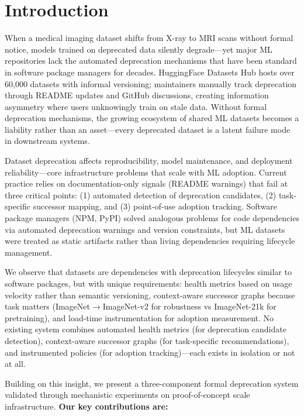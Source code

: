 \section{Introduction}

When a medical imaging dataset shifts from X-ray to MRI scans without formal notice, models trained on deprecated data silently degrade---yet major ML repositories lack the automated deprecation mechanisms that have been standard in software package managers for decades. HuggingFace Datasets Hub hosts over 60,000 datasets with informal versioning; maintainers manually track deprecation through README updates and GitHub discussions, creating information asymmetry where users unknowingly train on stale data. Without formal deprecation mechanisms, the growing ecosystem of shared ML datasets becomes a liability rather than an asset---every deprecated dataset is a latent failure mode in downstream systems.

Dataset deprecation affects reproducibility, model maintenance, and deployment reliability---core infrastructure problems that scale with ML adoption. Current practice relies on documentation-only signals (README warnings) that fail at three critical points: (1) automated detection of deprecation candidates, (2) task-specific successor mapping, and (3) point-of-use adoption tracking. Software package managers (NPM, PyPI) solved analogous problems for code dependencies via automated deprecation warnings and version constraints, but ML datasets were treated as static artifacts rather than living dependencies requiring lifecycle management.

We observe that datasets are dependencies with deprecation lifecycles similar to software packages, but with unique requirements: health metrics based on usage velocity rather than semantic versioning, context-aware successor graphs because task matters (ImageNet$\rightarrow$ImageNet-v2 for robustness vs ImageNet-21k for pretraining), and load-time instrumentation for adoption measurement. No existing system combines automated health metrics (for deprecation candidate detection), context-aware successor graphs (for task-specific recommendations), and instrumented policies (for adoption tracking)---each exists in isolation or not at all.

Building on this insight, we present a three-component formal deprecation system validated through mechanistic experiments on proof-of-concept scale infrastructure. \textbf{Our key contributions are:}

